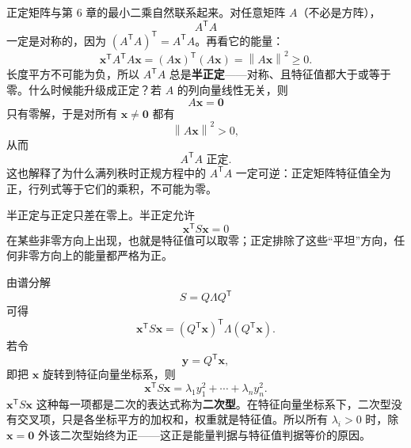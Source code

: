 \documentclass[UTF8,a4paper,12pt]{ctexart}
\numberwithin{equation}{section}
\newcommand{\norm}[1]{\left\lVert #1 \right\rVert}
\newcommand{\trans}{^{\mathsf T}}
\begin{document}
	正定矩阵与第 6 章的最小二乘自然联系起来。对任意矩阵 $A$（不必是方阵），
	\begin{equation}\label{eq:7.76}
	A\trans A
	\end{equation}
	一定是对称的，因为 $(A\trans A)\trans=A\trans A$。再看它的能量：
	\begin{equation}\label{eq:7.77}
	\bm{x}\trans A\trans A\bm{x}
	=(A\bm{x})\trans(A\bm{x})
	=\norm{A\bm{x}}^2
	\ge 0.
	\end{equation}
	长度平方不可能为负，所以 $A\trans A$ 总是\textbf{半正定}——对称、且特征值都大于或等于零。什么时候能升级成正定？若 $A$ 的列向量线性无关，则
	\begin{equation}\label{eq:7.78}
	A\bm{x}=\bm{0}
	\end{equation}
	只有零解，于是对所有 $\bm{x}\neq\bm{0}$ 都有
	\begin{equation}\label{eq:7.79}
	\norm{A\bm{x}}^2>0,
	\end{equation}
	从而
	\begin{equation}\label{eq:7.80}
	\boxed{A\trans A\text{ 正定}.}
	\end{equation}
	这也解释了为什么满列秩时正规方程中的 $A\trans A$ 一定可逆：正定矩阵特征值全为正，行列式等于它们的乘积，不可能为零。

	半正定与正定只差在零上。半正定允许
	\begin{equation}\label{eq:7.81}
	\bm{x}\trans S\bm{x}=0
	\end{equation}
	在某些非零方向上出现，也就是特征值可以取零；正定排除了这些“平坦”方向，任何非零方向上的能量都严格为正。

	由谱分解
	\begin{equation}\label{eq:7.82}
	S=Q\Lambda Q\trans
	\end{equation}
	可得
	\begin{equation}\label{eq:7.83}
	\bm{x}\trans S\bm{x}
	=
	(Q\trans\bm{x})\trans
	\Lambda
	(Q\trans\bm{x}).
	\end{equation}
	若令
	\begin{equation}\label{eq:7.84}
	\bm{y}=Q\trans\bm{x},
	\end{equation}
	即把 $\bm{x}$ 旋转到特征向量坐标系，则
	\begin{equation}\label{eq:7.85}
	\bm{x}\trans S\bm{x}
	=
	\lambda_1y_1^2+\cdots+\lambda_ny_n^2.
	\end{equation}
	$\bm{x}\trans S\bm{x}$ 这种每一项都是二次的表达式称为\textbf{二次型}。在特征向量坐标系下，二次型没有交叉项，只是各坐标平方的加权和，权重就是特征值。所以所有 $\lambda_i>0$ 时，除 $\bm{x}=\bm{0}$ 外该二次型始终为正——这正是能量判据与特征值判据等价的原因。
\end{document}
